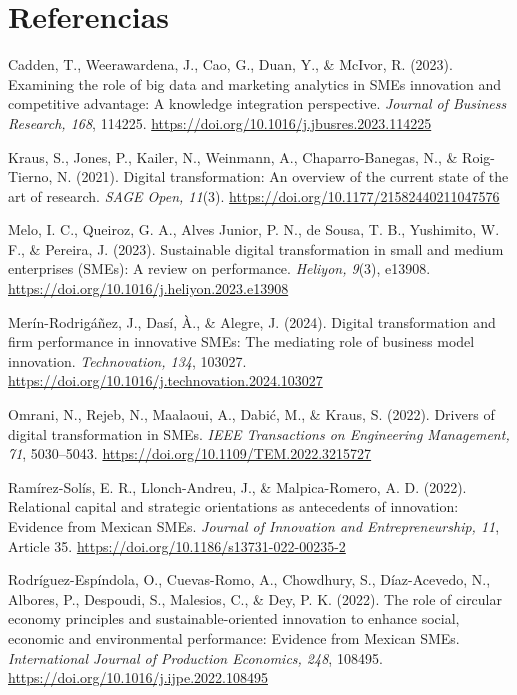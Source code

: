 \documentclass[spanish,letterpaper,oneside]{article}
\newenvironment{apareferences}{%
  \begin{list}{}{\setlength{\leftmargin}{1.27cm}%
    \setlength{\itemindent}{-1.27cm}%
    \setlength{\itemsep}{0.75\baselineskip}%
    \setlength{\parsep}{0pt}}}{\end{list}}
\begin{document}
\section*{Referencias}
\begin{apareferences}
  \item Cadden, T., Weerawardena, J., Cao, G., Duan, Y., \& McIvor, R. (2023). Examining the role of big data and marketing analytics in SMEs innovation and competitive advantage: A knowledge integration perspective. \emph{Journal of Business Research, 168}, 114225. \url{https://doi.org/10.1016/j.jbusres.2023.114225}

  \item Kraus, S., Jones, P., Kailer, N., Weinmann, A., Chaparro-Banegas, N., \& Roig-Tierno, N. (2021). Digital transformation: An overview of the current state of the art of research. \emph{SAGE Open, 11}(3). \url{https://doi.org/10.1177/21582440211047576}

  \item Melo, I. C., Queiroz, G. A., Alves Junior, P. N., de Sousa, T. B., Yushimito, W. F., \& Pereira, J. (2023). Sustainable digital transformation in small and medium enterprises (SMEs): A review on performance. \emph{Heliyon, 9}(3), e13908. \url{https://doi.org/10.1016/j.heliyon.2023.e13908}

  \item Merín-Rodrigáñez, J., Dasí, À., \& Alegre, J. (2024). Digital transformation and firm performance in innovative SMEs: The mediating role of business model innovation. \emph{Technovation, 134}, 103027. \url{https://doi.org/10.1016/j.technovation.2024.103027}

  \item Omrani, N., Rejeb, N., Maalaoui, A., Dabić, M., \& Kraus, S. (2022). Drivers of digital transformation in SMEs. \emph{IEEE Transactions on Engineering Management, 71}, 5030--5043. \url{https://doi.org/10.1109/TEM.2022.3215727}

  \item Ramírez-Solís, E. R., Llonch-Andreu, J., \& Malpica-Romero, A. D. (2022). Relational capital and strategic orientations as antecedents of innovation: Evidence from Mexican SMEs. \emph{Journal of Innovation and Entrepreneurship, 11}, Article 35. \url{https://doi.org/10.1186/s13731-022-00235-2}

  \item Rodríguez-Espíndola, O., Cuevas-Romo, A., Chowdhury, S., Díaz-Acevedo, N., Albores, P., Despoudi, S., Malesios, C., \& Dey, P. K. (2022). The role of circular economy principles and sustainable-oriented innovation to enhance social, economic and environmental performance: Evidence from Mexican SMEs. \emph{International Journal of Production Economics, 248}, 108495. \url{https://doi.org/10.1016/j.ijpe.2022.108495}


\end{apareferences}
\end{document}
